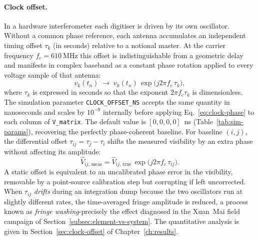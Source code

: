 \paragraph{Clock offset.} In a hardware interferometer each digitiser is
driven by its own oscillator. Without a common phase reference, each antenna
accumulates an independent timing offset $\tau_k$ (in seconds) relative to a
notional master. At the carrier frequency $f_c = \SI{610}{\mega\hertz}$ this
offset is indistinguishable from a geometric delay and manifests in complex
baseband as a constant phase rotation applied to every voltage sample of
that antenna:
\begin{equation}
  v_k(t_n)\;\longrightarrow\;
  v_k(t_n)\,\exp\!\bigl(j2\pi f_c\,\tau_k\bigr),
  \label{eq:clock-phase}
\end{equation}
where $\tau_k$ is expressed in seconds so that the exponent $2\pi f_c\tau_k$ is
dimensionless. The simulation parameter \texttt{CLOCK\_OFFSET\_NS} accepts the
same quantity in nanoseconds and scales by $10^{-9}$ internally before applying
Eq.~\eqref{eq:clock-phase} to each column of \texttt{V\_matrix}.
The default value is $[0,0,0,0]$~ns (Table~\ref{tab:sim-params}), recovering
the perfectly phase-coherent baseline. For baseline $(i,j)$, the differential
offset $\tau_{ij}=\tau_j-\tau_i$ shifts the measured visibility by an extra
phase without affecting its amplitude:
\begin{equation}
  \hat{V}_{ij,\,\mathrm{meas}}
  = \hat{V}_{ij,\,\mathrm{true}}\,
    \exp\!\bigl(j2\pi f_c\,\tau_{ij}\bigr).
  \label{eq:vis-clock}
\end{equation}
A static offset is equivalent to an uncalibrated phase error in the
visibility, removable by a point-source calibration step but corrupting if
left uncorrected. When $\tau_{ij}$ \emph{drifts} during an integration dump
because the two oscillators run at slightly different rates, the
time-averaged fringe amplitude is reduced, a process known as
\emph{fringe washing}-precisely the effect diagnosed in the Xuan~Mai field
campaign of Section~\ref{subsec:element-vs-system}. The quantitative analysis
is given in Section~\ref{sec:clock-offset} of Chapter~\ref{ch:results}.

